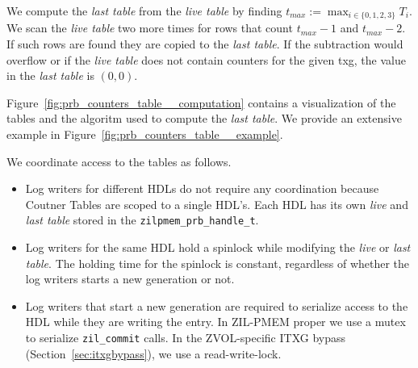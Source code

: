 \documentclass[12pt,a4paper,twoside]{book}
\begin{document}
We compute the \textit{last table} from the \textit{live table} by finding $t_{max} := \max_{i \in \{0,1,2,3\}} T_i$.
We scan the \textit{live table} two more times for rows that count $t_{max}-1$ and $t_{max}-2$.
If such rows are found they are copied to the \textit{last table}.
If the subtraction would overflow or if the \textit{live table} does not contain counters for the given txg, the value in the \textit{last table} is $(0,0)$.

Figure~\ref{fig:prb_counters_table__computation} contains a visualization of the tables and the algoritm used to compute the \textit{last table}.
We provide an extensive example in Figure~\ref{fig:prb_counters_table__example}.

We coordinate access to the tables as follows.
\begin{itemize}[noitemsep]
\item Log writers for different HDLs do not require any coordination because Coutner Tables are scoped to a single HDL's.
    Each HDL has its own \textit{live} and \textit{last table} stored in the \lstinline{zilpmem_prb_handle_t}.
\item Log writers for the same HDL hold a spinlock while modifying the \textit{live} or \textit{last table}.
    The holding time for the spinlock is constant, regardless of whether the log writers starts a new generation or not.
\item Log writers that start a new generation are required to serialize access to the HDL while they are writing the entry.
    In ZIL-PMEM proper we use a mutex to serialize \lstinline{zil_commit} calls.
    In the ZVOL-specific ITXG bypass (Section~\ref{sec:itxgbypass}), we use a read-write-lock.
\end{itemize}
\end{document}
